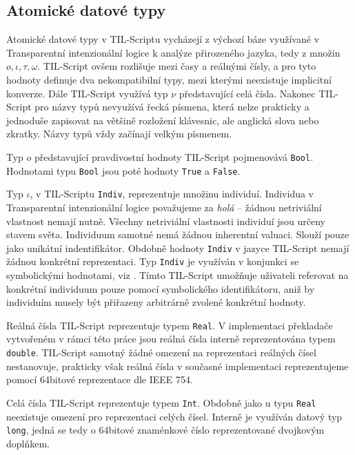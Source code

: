 \subsection{Atomické datové typy}

Atomické datové typy v TIL-Scriptu vycházejí z výchozí báze využívané v Transparentní intenzionální
logice k analýze přirozeného jazyka, tedy z množin ${o, \iota, \tau, \omega}$. TIL-Script ovšem
rozlišuje mezi časy a reálnými čísly, a pro tyto hodnoty definuje dva nekompatibilní typy, mezi
kterými neexistuje implicitní konverze. Dále TIL-Script využívá typ $\nu$ představující celá
čísla. Nakonec TIL-Script pro názvy typů nevyužívá řecká písmena, která nelze prakticky a jednoduše
zapisovat na většině rozložení klávesnic, ale anglická slova nebo zkratky. Názvy typů vždy začínají
velkým písmenem.

Typ $o$ představující pravdivostní hodnoty TIL-Script pojmenovává \lstinline{Bool}. Hodnotami typu
\lstinline{Bool} jsou poté hodnoty \lstinline{True} a \lstinline{False}.

Typ $\iota$, v TIL-Scriptu \lstinline{Indiv}, reprezentuje množinu individuí. Individua
v Transparentní intenzionální logice považujeme za \textit{holá} -- žádnou netriviální vlastnost
nemají nutně. Všechny netriviální vlastnosti individuí jsou určeny stavem světa. Individuum samotné
nemá žádnou inherentní valuaci. Slouží pouze jako unikátní indentifikátor. Obdobně hodnoty
\lstinline{Indiv} v jazyce TIL-Script nemají žádnou konkrétní reprezentaci. Typ \lstinline{Indiv}
je využíván v konjunkci se symbolickými hodnotami, viz . Tímto TIL-Script
umožňuje uživateli referovat na konkrétní individuum pouze pomocí symbolického identifikátoru,
aniž by individuím musely být přiřazeny arbitrárně zvolené konkrétní hodnoty.

Reálná čísla TIL-Script reprezentuje typem \lstinline{Real}. V implementaci překladače vytvořeném
v rámci této práce jsou reálná čísla interně reprezentována typem \lstinline{double}. TIL-Script
samotný žádné omezení na reprezentaci reálných čísel nestanovuje, prakticky však reálná čísla
v současné implementaci reprezentujeme pomocí 64bitové reprezentace dle IEEE 754.

Celá čísla TIL-Script reprezentuje typem \lstinline{Int}. Obdobně jako u typu \lstinline{Real}
neexistuje omezení pro reprezentaci celých čísel. Interně je využíván datový typ \lstinline{long},
jedná se tedy o 64bitové znaménkové číslo reprezentované dvojkovým doplňkem.

